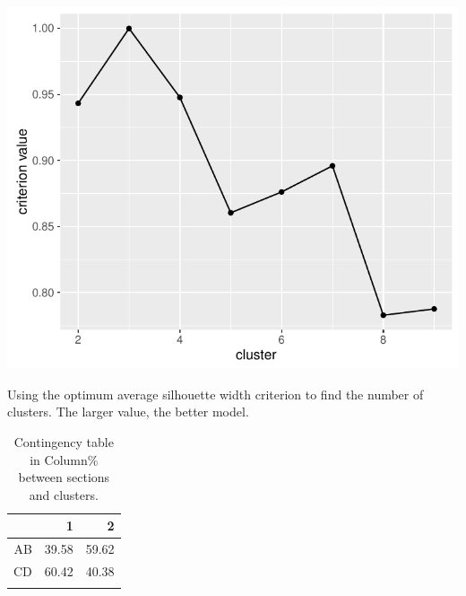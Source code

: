 \documentclass[12pt,nohyper]{tufte-handout}\usepackage[]{graphicx}\usepackage[]{color}
\begin{document}
\begin{marginfigure}
\includegraphics[width=0.98\linewidth]{Stat101_allSections_clustasw}
\caption{\label{mar:asw}Using the optimum average silhouette 
width criterion to find the number of clusters. The larger value, 
the better model.}
\end{marginfigure}%
\begin{longtable}{rrr}
  \hline
 & 1 & 2 \\ 
  \hline
AB & 39.58 & 59.62 \\ 
  CD & 60.42 & 40.38 \\ 
   \hline
\hline
\caption{Contingency table in Column\% between sections and clusters.} 
\label{tab:cluster_pct}
\end{longtable}
\end{document}
